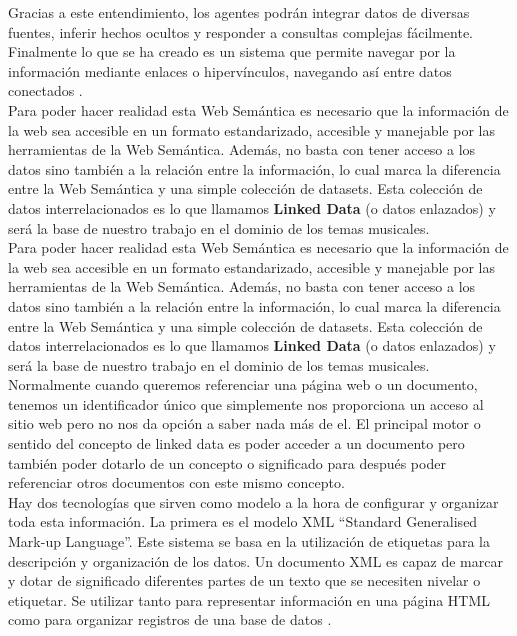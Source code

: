 Gracias a este entendimiento, los agentes podrán integrar datos de diversas fuentes, inferir hechos ocultos y responder a consultas complejas fácilmente. Finalmente lo que se ha creado es un sistema que permite navegar por la información mediante enlaces o hipervínculos, navegando así entre datos conectados \cite{sakr2018}.\\

Para poder hacer realidad esta Web Semántica es necesario que la información de la web sea accesible en un formato estandarizado, accesible y manejable por las herramientas de la Web Semántica. Además, no basta con tener acceso a los datos sino también a la relación entre la información, lo cual marca la diferencia entre la Web Semántica y una simple colección de datasets. Esta colección de datos interrelacionados es lo que llamamos \textbf{Linked Data} (o datos enlazados) y será la base de nuestro trabajo en el dominio de los temas musicales.\\


Para poder hacer realidad esta Web Semántica es necesario que la información de la web sea accesible en un formato estandarizado, accesible y manejable por las herramientas de la Web Semántica. Además, no basta con tener acceso a los datos sino también a la relación entre la información, lo cual marca la diferencia entre la Web Semántica y una simple colección de datasets. Esta colección de datos interrelacionados es lo que llamamos \textbf{Linked Data} (o datos enlazados) y será la base de nuestro trabajo en el dominio de los temas musicales. Normalmente cuando queremos referenciar una página web o un documento, tenemos un identificador único que simplemente nos proporciona un acceso al sitio web pero no nos da opción a saber nada más de el. El principal motor o sentido del concepto de linked data es poder acceder a un documento pero también poder dotarlo de un concepto o significado para después poder referenciar otros documentos con este mismo concepto. \\

Hay dos tecnologías que sirven como modelo a la hora de configurar y organizar toda esta información. La primera es el modelo XML ``Standard Generalised Mark-up Language''. Este sistema se basa en la utilización de etiquetas para la descripción y organización de los datos. Un documento XML es capaz de marcar y dotar de significado diferentes partes de un texto que se necesiten nivelar o etiquetar. Se utilizar tanto para representar información en una página HTML como para organizar registros de una base de datos \cite{heath2011}. \\

